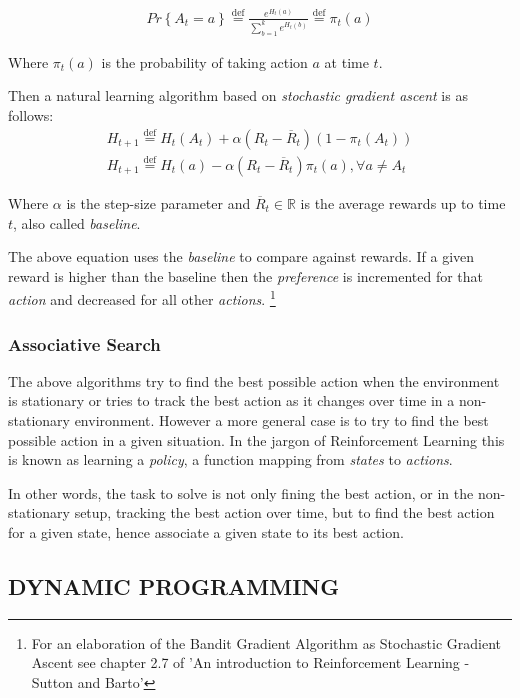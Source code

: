\documentclass[paper=a4,fontsize=11pt]{scrartcl} %
\numberwithin{equation}{section} %
\numberwithin{figure}{section} %
\numberwithin{table}{section} %
\newcommand{\eqdef}{\stackrel{\text{def}}{=}}
\begin{document}
\begin{align}
Pr \left\lbrace A_t=a \right\rbrace \eqdef \frac{ e^{H_t(a)} }{ \sum_{b=1}^k e^{H_t(b)} } \eqdef \pi_t(a)
\end{align}

Where $ \pi_t(a) $ is the probability of taking action $a$ at time $t$.

Then a natural learning algorithm based on \textit{stochastic gradient ascent} is as follows:
\begin{equation}
	\begin{aligned}
		H_{t+1} \eqdef H_t(A_t) + \alpha (R_t - \overline{R}_t) (1 - \pi_t(A_t)) \\
        H_{t+1} \eqdef H_t(a) - \alpha (R_t - \overline{R}_t) \pi_t(a), 	
        \forall a \neq A_t
	\end{aligned}
\end{equation}

Where $\alpha$ is the step-size parameter and $\overline{R}_t \in \mathbb{R}$ is the average rewards up to time $t$, 
also called \textit{baseline}.

The above equation uses the \textit{baseline} to compare against rewards. If a given reward is higher than the
baseline then the \textit{preference} is incremented for that \textit{action} and decreased for all other \textit{actions}.
\footnote{For an elaboration of the Bandit Gradient Algorithm as Stochastic Gradient Ascent see chapter 2.7 of 'An introduction to Reinforcement Learning - Sutton and Barto'}

\subsubsection{Associative Search}
The above algorithms try to find the best possible action when the environment is stationary or tries to track the best
action as it changes over time in a non-stationary environment. However a more general case is to try to find the best possible
action in a given situation.
In the jargon of Reinforcement Learning this is known as learning a \textit{policy}, 
a function mapping from \textit{states} to \textit{actions}.

In other words, the task to solve is not only fining the best action, or in the
non-stationary setup, tracking the best action over time, but to find the
best action for a given state, hence associate a given state to its best action.

\subsection{DYNAMIC PROGRAMMING}
\end{document}
